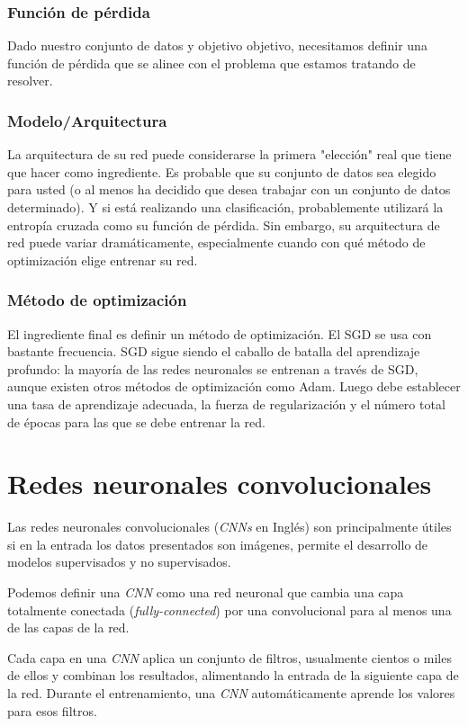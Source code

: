 \documentclass[a4paper,12pt]{article}
\begin{document}
\subsubsection{Función de pérdida}
Dado nuestro conjunto de datos y objetivo objetivo, necesitamos definir una función de pérdida que se alinee con el problema que estamos tratando de resolver.

\subsubsection{Modelo/Arquitectura}
La arquitectura de su red puede considerarse la primera "elección" real que tiene que hacer como ingrediente. Es probable que su conjunto de datos sea elegido para usted (o al menos ha decidido que desea trabajar con un conjunto de datos determinado). Y si está realizando una clasificación, probablemente utilizará la entropía cruzada como su función de pérdida.
Sin embargo, su arquitectura de red puede variar dramáticamente, especialmente cuando con qué método de optimización elige entrenar su red.

\subsubsection{Método de optimización}
El ingrediente final es definir un método de optimización. El SGD se usa con bastante frecuencia.
SGD sigue siendo el caballo de batalla del aprendizaje profundo: la mayoría de las redes neuronales se entrenan a través de SGD, aunque existen otros métodos de optimización como Adam.
Luego debe establecer una tasa de aprendizaje adecuada, la fuerza de regularización y el número total de épocas para las que se debe entrenar la red.

\section{Redes neuronales convolucionales}
Las redes neuronales convolucionales \citep{rosebrock2017deep} (\textit{CNNs} en Inglés) son principalmente útiles si en la entrada los datos presentados son imágenes, permite el desarrollo de modelos supervisados y no supervisados.

Podemos definir una \textit{CNN} como una red neuronal que cambia una capa totalmente conectada (\textit{fully-connected}) por una convolucional para al menos una de las capas de la red.

Cada capa en una \textit{CNN} aplica un conjunto de filtros, usualmente cientos o miles de ellos y combinan los resultados, alimentando la entrada de la siguiente capa de la red. Durante el entrenamiento, una \textit{CNN} automáticamente aprende los valores para esos filtros.
\end{document}
